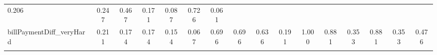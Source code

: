 \documentclass[12pt]{article}
\begin{document}
\begin{table}
\begin{tabular}{p{2.5cm}*{15}{c}}
0.206 & 0.247 & 0.467 & 0.171 & 0.087 & 0.726 & 0.061 \\billPaymentDiff_veryHard  & 0.211 & 0.174 & 0.174 & 0.154 & 0.067 & 0.696 & 0.696 & 0.636 & 0.191 & 1.000 & 0.881 & 0.353 & 0.881 & 0.353 & 0.476 \\
\hline
\multicolumn{16}{p{43cm}}{\footnotesize  }\\
\end{tabular}
\end{table}
\end{document}
